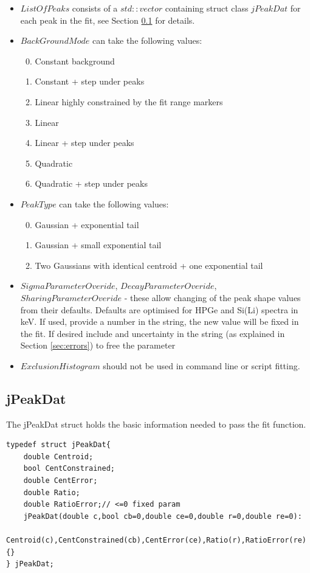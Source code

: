 \documentclass[a4paper,10pt]{article}
\begin{document}
\renewcommand{\labelenumi}{\arabic{enumi}}
\begin{itemize}
	\item $ListOfPeaks$ consists of a $std::vector$ containing struct class $jPeakDat$ for each peak in the fit, see Section \ref{sec:jpeakdata} for details.
	\item $BackGroundMode$ can take the following values:
      \begin{enumerate}
      \setcounter{enumi}{-1}
      \item Constant background
      \item Constant + step under peaks
      \item Linear highly constrained by the fit range markers
      \item Linear
      \item Linear + step under peaks
      \item Quadratic
      \item Quadratic + step under peaks
      \end{enumerate}
    \item $PeakType$ can take the following values:
      \begin{enumerate}
      \setcounter{enumi}{-1}
      \item Gaussian + exponential tail
      \item Gaussian + small exponential tail
      \item Two Gaussians with identical centroid + one exponential tail
      \end{enumerate}
    \item $SigmaParameterOveride$, $DecayParameterOveride$, $SharingParameterOveride$ - these allow changing of the peak shape values from their defaults. Defaults are optimised for HPGe and Si(Li) spectra in keV. If used, provide a number in the string, the new value will be fixed in the fit. If desired include and uncertainty in the string (as explained in Section \ref{sec:errors}) to free the parameter
    \item $ExclusionHistogram$ should not be used in command line or script fitting.   
\end{itemize}

\subsection{jPeakDat}\label{sec:jpeakdata}
The jPeakDat struct holds the basic information needed to pass the fit function.
\lstset{language=C++}
\begin{lstlisting}
typedef struct jPeakDat{
	double Centroid;
	bool CentConstrained;
	double CentError;
	double Ratio;
	double RatioError;// <=0 fixed param
	jPeakDat(double c,bool cb=0,double ce=0,double r=0,double re=0):
	Centroid(c),CentConstrained(cb),CentError(ce),Ratio(r),RatioError(re){}
} jPeakDat;
\end{lstlisting}
\end{document}
